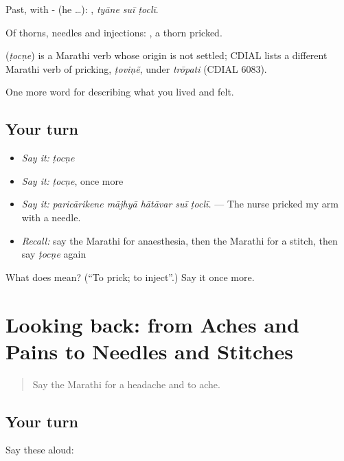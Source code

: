 Past, with - (he …):   , \emph{tyāne suī ṭoclī}.

Of thorns, needles and injections:  , a thorn pricked.

\begin{cousinweb}
\textbf{} (\emph{ṭocṇe}) is a Marathi verb whose origin is not settled; CDIAL lists a different Marathi verb of pricking, \emph{ṭoviṇẽ}, under \emph{trōpati} (CDIAL 6083).
\end{cousinweb}

\begin{grammarlens}[title={What you've built}]
One more word for describing what you lived and felt.
\end{grammarlens}

\subsection*{Your turn}
\begin{itemize}
\raggedright
  \item \emph{Say it:} \emph{ṭocṇe}
  \item \emph{Say it:} \emph{ṭocṇe}, once more
  \item \emph{Say it:} \emph{paricārikene mājhyā hātāvar suī ṭoclī.} — The nurse pricked my arm with a needle.
  \item \emph{Recall:} say the Marathi for anaesthesia, then the Marathi for a stitch, then say \emph{ṭocṇe} again
\end{itemize}

\begin{tcolorbox}[breakable,colback=teal!4,colframe=teal!35!black,title={Before you move on}]
What does  mean? (\textquotedblleft{}To prick; to inject\textquotedblright{}.) Say it once more.
\end{tcolorbox}
\section[(dialogue)]{Looking back: from Aches and Pains to Needles and Stitches}

\label{lesson:MR-R489-review-482-489}



\begin{quote}
Say the Marathi for a headache and to ache.
\end{quote}

\subsection*{Your turn}
Say these aloud:

